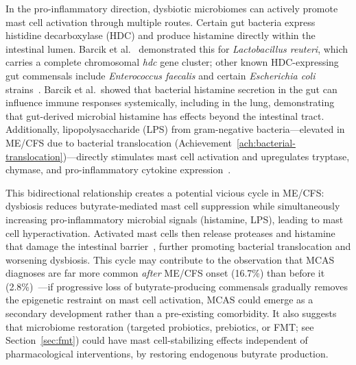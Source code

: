 In the pro-inflammatory direction, dysbiotic microbiomes can actively promote mast cell activation through multiple routes. Certain gut bacteria express histidine decarboxylase (HDC) and produce histamine directly within the intestinal lumen. Barcik et al.~\cite{Barcik2019histamine} demonstrated this for \textit{Lactobacillus reuteri}, which carries a complete chromosomal \textit{hdc} gene cluster; other known HDC-expressing gut commensals include \textit{Enterococcus faecalis} and certain \textit{Escherichia coli} strains~\cite{DeZuani2018mastmicrobiota}. Barcik et al.\ showed that bacterial histamine secretion in the gut can influence immune responses systemically, including in the lung, demonstrating that gut-derived microbial histamine has effects beyond the intestinal tract. Additionally, lipopolysaccharide (LPS) from gram-negative bacteria---elevated in ME/CFS due to bacterial translocation (Achievement~\ref{ach:bacterial-translocation})---directly stimulates mast cell activation and upregulates tryptase, chymase, and pro-inflammatory cytokine expression~\cite{DeZuani2018mastmicrobiota}.

This bidirectional relationship creates a potential vicious cycle in ME/CFS: dysbiosis reduces butyrate-mediated mast cell suppression while simultaneously increasing pro-inflammatory microbial signals (histamine, LPS), leading to mast cell hyperactivation. Activated mast cells then release proteases and histamine that damage the intestinal barrier~\cite{GutPermeability2023}, further promoting bacterial translocation and worsening dysbiosis. This cycle may contribute to the observation that MCAS diagnoses are far more common \textit{after} ME/CFS onset (16.7\%) than before it (2.8\%)~\cite{Frioni2025MCAS}---if progressive loss of butyrate-producing commensals gradually removes the epigenetic restraint on mast cell activation, MCAS could emerge as a secondary development rather than a pre-existing comorbidity. It also suggests that microbiome restoration (targeted probiotics, prebiotics, or FMT; see Section~\ref{sec:fmt}) could have mast cell-stabilizing effects independent of pharmacological interventions, by restoring endogenous butyrate production.

